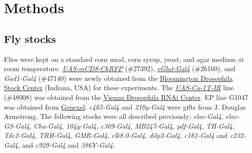 \section*{Methods}

\subsection*{Fly stocks}

Flies were kept on a standard corn meal, corn syrup, yeast, and agar medium at room temperature.
\href{http://flystocks.bio.indiana.edu/Reports/27392.html}{\emph{UAS-mCD8-ChRFP}} (\#27392), \href{http://flystocks.bio.indiana.edu/Reports/26160.html}{\emph{vGlut-Gal4}} (\#26160), and \emph{Gad1-Gal4} (\#47140) were newly obtained from the \href{http://flystocks.bio.indiana.edu}{Bloomington Drosophila Stock Center} (Indiana, USA) for these experiments.
The \href{http://stockcenter.vdrc.at/control/product/~VIEW_INDEX=0/~VIEW_SIZE=100/~product_id=48008}{\emph{UAS-Ca-\alpha1T-IR}} line (\#48008) was obtained from the \href{http://stockcenter.vdrc.at}{Vienna Drosophila RNAi Center}.
EP line G1047 was obtained from \href{http://genexel.kaist.ac.kr}{Genexel}.
\emph{c465-Gal4} and \emph{210y-Gal4} were gifts from J. Douglas Armstrong\cite{Young:2010jq}.
The following stocks were all described previously: \emph{elav-Gal4}\cite{Lin:1994vn}, \emph{elav-GS-Gal4}\cite{Osterwalder:2001cl}, \emph{Cha-Gal4}\cite{Kitamoto:2001ue}, \emph{104y-Gal4}\cite{sakai:2006aa}, \emph{c309-Gal4}\cite{connolly:1996aa}, \emph{MB247-Gal4}\cite{zars:2000aa}, \emph{pdf-Gal4}\cite{renn:1999ab}, \emph{TH-Gal4}\cite{friggi-grelin:2003aa}, \emph{Tdc2-Gal4}\cite{alekseyenko:2010aa}, \emph{TRH-Gal4}\cite{alekseyenko:2010aa}, \emph{GMR-Gal4}\cite{freeman:1996aa},  \emph{clk8.0-Gal4}\cite{glossop:2003aa}, \emph{dilp2-Gal4}\cite{Rulifson:2002cg}, \emph{c161-Gal4} and \emph{c232-Gal4}\cite{renn:1999aa}, and \emph{c929-Gal4} and \emph{386Y-Gal4}\cite{taghert:2001aa}.
